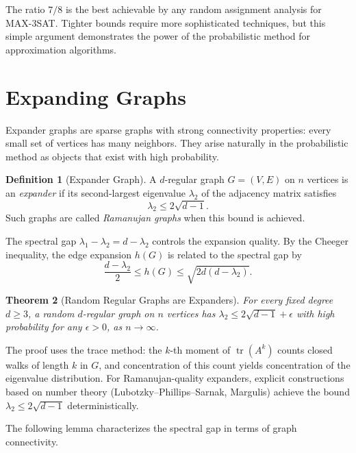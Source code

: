 \documentclass[twoside,12pt]{book}
\theoremstyle{plain}
\newtheorem{theorem}{Theorem}[chapter]
\theoremstyle{definition}
\newtheorem{definition}[theorem]{Definition}
\theoremstyle{remark}
\begin{document}
The ratio $7/8$ is the best achievable by any random assignment analysis
for MAX-3SAT. Tighter bounds require more sophisticated techniques, but
this simple argument demonstrates the power of the probabilistic method
for approximation algorithms.

\section{Expanding Graphs}
\label{sec:expanders}

Expander graphs are sparse graphs with strong connectivity properties:
every small set of vertices has many neighbors. They arise naturally in
the probabilistic method as objects that exist with high probability.

\begin{definition}[Expander Graph]
A $d$-regular graph $G = (V, E)$ on $n$ vertices is an \emph{expander} if
its second-largest eigenvalue $\lambda_2$ of the adjacency matrix satisfies
\[
\lambda_2 \leq 2\sqrt{d - 1}.
\]
Such graphs are called \emph{Ramanujan graphs} when this bound is achieved.
\end{definition}

The spectral gap $\lambda_1 - \lambda_2 = d - \lambda_2$ controls the
expansion quality. By the Cheeger inequality, the edge expansion $h(G)$
is related to the spectral gap by
\[
\frac{d - \lambda_2}{2} \leq h(G) \leq \sqrt{2d(d - \lambda_2)}.
\]

\begin{theorem}[Random Regular Graphs are Expanders]
\label{thm:random-expander}
For every fixed degree $d \geq 3$, a random $d$-regular graph on $n$
vertices has $\lambda_2 \leq 2\sqrt{d-1} + \epsilon$ with high probability
for any $\epsilon > 0$, as $n \to \infty$.
\end{theorem}

The proof uses the trace method: the $k$-th moment of
$\operatorname{tr}(A^k)$ counts closed walks of length $k$ in $G$, and
concentration of this count yields concentration of the eigenvalue
distribution. For Ramanujan-quality expanders, explicit constructions
based on number theory (Lubotzky--Phillips--Sarnak, Margulis) achieve the
bound $\lambda_2 \leq 2\sqrt{d-1}$ deterministically.

The following lemma characterizes the spectral gap in terms of graph
connectivity.
\end{document}
